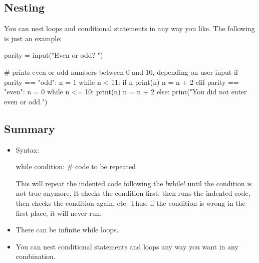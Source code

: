\documentclass[11pt]{cselabheader}
\begin{document}
\subsection{Nesting}

You can nest loops and conditional statements in any way you
like. The following is just an example:

\begin{python3code}
parity = input("Even or odd? ")

# prints even or odd numbers between 0 and 10, depending on user input
if parity == "odd":
    n = 1
    while n < 11:
        if n %
            print(n)
        n = n + 2
elif parity == "even":
    n = 0
    while n <= 10:
        print(n)
        n = n + 2
else:
    print("You did not enter even or odd.")
\end{python3code}

\subsection{Summary}

\begin{itemize}
    \item Syntax:

      \begin{python3code}
while condition:
    # code to be repeated
      \end{python3code}

    This will repeat the indented code following the \pythoninline!while! until
    the condition is not true anymore. It checks the condition first, then runs
    the indented code, then checks the condition again, etc. Thus, if the
    condition is wrong in the first place, it will never run.

%
%

  \item There can be infinite while loops.
  \item You can nest conditional statements and loops any way you want in any
    combination.
\end{itemize}
\end{document}
